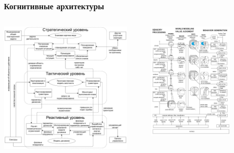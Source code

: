 \documentclass[default]{beamer}
\begin{document}
	\begin{frame}
		\frametitle{Когнитивные архитектуры}
		
		\begin{columns}
			\begin{column}{0.5\textwidth}
				\includegraphics[width=0.9\textwidth]{strl/architecture}
			\end{column}
			\begin{column}{0.5\textwidth}
				\includegraphics[width=0.8\textwidth]{strl/4d-rcs}
			\end{column}			
		\end{columns}
	\end{frame}
	
\end{document}
